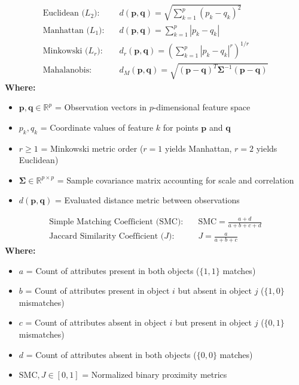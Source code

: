 \begin{formulabox}
\begin{align*}
    \text{Euclidean ($L_2$):} \quad & d(\mathbf{p}, \mathbf{q}) = \sqrt{\sum_{k=1}^p (p_k - q_k)^2} \\[3pt]
    \text{Manhattan ($L_1$):} \quad & d(\mathbf{p}, \mathbf{q}) = \sum_{k=1}^p |p_k - q_k| \\[3pt]
    \text{Minkowski ($L_r$):} \quad & d_r(\mathbf{p}, \mathbf{q}) = \left(\sum_{k=1}^p |p_k - q_k|^r \right)^{1/r} \\[3pt]
    \text{Mahalanobis:} \quad & d_M(\mathbf{p}, \mathbf{q}) = \sqrt{(\mathbf{p} - \mathbf{q})^T \boldsymbol{\Sigma}^{-1} (\mathbf{p} - \mathbf{q})}
\end{align*}
\textbf{Where:}
\begin{itemize}[noitemsep, topsep=1pt]
    \item $\mathbf{p}, \mathbf{q} \in \mathbb{R}^p$ = Observation vectors in $p$-dimensional feature space
    \item $p_k, q_k$ = Coordinate values of feature $k$ for points $\mathbf{p}$ and $\mathbf{q}$
    \item $r \ge 1$ = Minkowski metric order ($r=1$ yields Manhattan, $r=2$ yields Euclidean)
    \item $\boldsymbol{\Sigma} \in \mathbb{R}^{p \times p}$ = Sample covariance matrix accounting for scale and correlation
    \item $d(\mathbf{p}, \mathbf{q})$ = Evaluated distance metric between observations
\end{itemize}
\end{formulabox}

\begin{formulabox}
\begin{align*}
    \text{Simple Matching Coefficient (SMC):} \quad & \text{SMC} = \frac{a + d}{a + b + c + d} \\[4pt]
    \text{Jaccard Similarity Coefficient ($J$):} \quad & J = \frac{a}{a + b + c}
\end{align*}
\textbf{Where:}
\begin{itemize}[noitemsep, topsep=1pt]
    \item $a$ = Count of attributes present in both objects ($\{1, 1\}$ matches)
    \item $b$ = Count of attributes present in object $i$ but absent in object $j$ ($\{1, 0\}$ mismatches)
    \item $c$ = Count of attributes absent in object $i$ but present in object $j$ ($\{0, 1\}$ mismatches)
    \item $d$ = Count of attributes absent in both objects ($\{0, 0\}$ matches)
    \item $\text{SMC}, J \in [0, 1]$ = Normalized binary proximity metrics
\end{itemize}
\end{formulabox}

